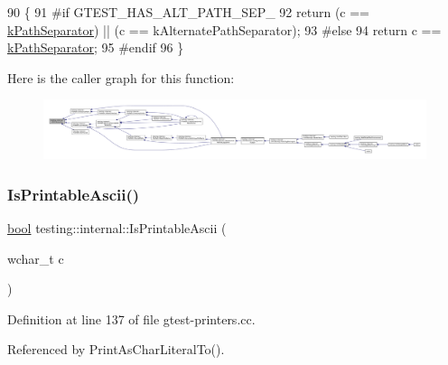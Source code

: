 \begin{DoxyCode}
90                                     \{
91 \textcolor{preprocessor}{#if GTEST\_HAS\_ALT\_PATH\_SEP\_}
92   \textcolor{keywordflow}{return} (c == \hyperlink{namespacetesting_1_1internal_afcd71adaa9d1e6df7b282a17fc48125c}{kPathSeparator}) || (c == kAlternatePathSeparator);
93 \textcolor{preprocessor}{#else}
94   \textcolor{keywordflow}{return} c == \hyperlink{namespacetesting_1_1internal_afcd71adaa9d1e6df7b282a17fc48125c}{kPathSeparator};
95 \textcolor{preprocessor}{#endif}
96 \}
\end{DoxyCode}
Here is the caller graph for this function\+:
\nopagebreak
\begin{figure}[H]
\begin{center}
\leavevmode
\includegraphics[width=350pt]{namespacetesting_1_1internal_a6b8d22cee9edbbfe56077420a6fa1cb1_icgraph}
\end{center}
\end{figure}
\mbox{\label{namespacetesting_1_1internal_a744a6dd74c12d1e2c16b3c03e14ed4d4}} 
\subsubsection{\texorpdfstring{Is\+Printable\+Ascii()}{IsPrintableAscii()}}
{\footnotesize\ttfamily \hyperlink{classbool}{bool} testing\+::internal\+::\+Is\+Printable\+Ascii (\begin{DoxyParamCaption}\item[{wchar\+\_\+t}]{c }\end{DoxyParamCaption})\hspace{0.3cm}{\ttfamily [inline]}}



Definition at line 137 of file gtest-\/printers.\+cc.



Referenced by Print\+As\+Char\+Literal\+To().


